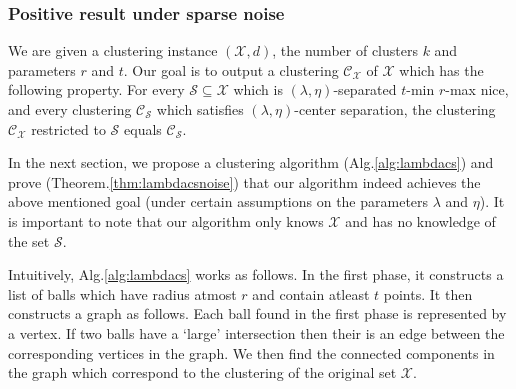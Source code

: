 \documentclass[anon,12pt]{colt2016} %
\newcommand{\mc}{\mathcal}
\begin{document}
\subsubsection{Positive result under sparse noise}
\label{section:lambdaPositiveResultSparseNoise}
We are given a clustering instance $(\mc X, d)$, the number of clusters $k$ and parameters $r$ and $t$. Our goal is to output a clustering $\mc C_{\mc X}$ of $\mc X$ which has the following property. For every $\mc S \subseteq \mc X$ which is $(\lambda, \eta)$-separated $t$-min $r$-max nice, and every clustering $\mc C_{\mc S}$ which satisfies $(\lambda, \eta)$-center separation, the clustering $\mc C_{\mc X}$ restricted to $\mc S$ equals $\mc C_{\mc S}$. 

In the next section, we propose a clustering algorithm (Alg.\ref{alg:lambdacs}) and prove (Theorem.\ref{thm:lambdacsnoise}) that our algorithm indeed achieves the above mentioned goal (under certain assumptions on the parameters $\lambda$ and $\eta$). It is important to note that our algorithm only knows $\mc X$ and has no knowledge of the set $\mc S$. 

Intuitively, Alg.\ref{alg:lambdacs} works as follows. In the first phase, it constructs a list of balls which have radius atmost $r$ and contain atleast $t$ points. It then constructs a graph as follows. Each ball found in the first phase is represented by a vertex. If two balls have a `large' intersection then their is an edge between the corresponding vertices in the graph. We then find the connected components in the graph which correspond to the clustering of the original set $\mc X$. 
\end{document}
